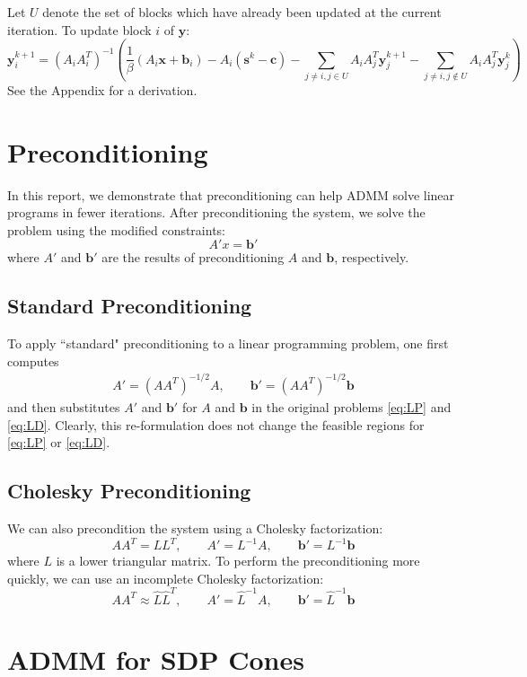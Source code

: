 \documentclass{article}
\begin{document}
Let $U$ denote the set of blocks which have already been updated at the current iteration. To update block $i$ of $\mathbf{y}$:
\[
\mathbf{y}_{i}^{k+1}=\left(A_{i}A_{i}^{T}\right)^{-1}\left(\frac{1}{\beta}\left(A_{i}\mathbf{x}+\mathbf{b}_{i}\right)-A_{i}\left(\mathbf{s}^{k}-\mathbf{c}\right)-\sum_{j\neq i,j\in U}A_{i}A_{j}^{T}\mathbf{y}_{j}^{k+1}-\sum_{j\neq i,j\notin U}A_{i}A_{j}^{T}\mathbf{y}_{j}^{k}\right)
\]
See the Appendix for a derivation.

\section{Preconditioning}
In this report, we demonstrate that preconditioning can help ADMM solve linear programs in fewer iterations. After preconditioning the system, we solve the problem using the modified constraints: 
\begin{equation}
A' x = \mathbf{b}'
\end{equation}
where $A'$ and $\mathbf{b}'$ are the results of preconditioning $A$ and $\mathbf{b}$, respectively.
\subsection*{Standard Preconditioning}
To apply ``standard" preconditioning to a linear programming problem, one first computes 
\begin{align}
A' = (AA^T )^{-1/2}A , \quad \quad \mathbf{b}' =(AA^T )^{-1/2}\mathbf{b}
\end{align}
and then substitutes $A'$ and $\mathbf{b}'$ for $A$ and $\mathbf{b}$ in the original problems \eqref{eq:LP} and \eqref{eq:LD}. Clearly, this re-formulation does not change the feasible regions for  \eqref{eq:LP} or \eqref{eq:LD}. 

\subsection*{Cholesky Preconditioning}
We  can also precondition the system using a Cholesky factorization:
\[
AA^{T}=LL^{T}, \quad \quad A'=L^{-1}A, \quad \quad \mathbf{b}'=L^{-1}\mathbf{b}
\]
where $L$ is a lower triangular matrix. To perform the preconditioning more quickly, we can use an incomplete Cholesky factorization:
\[
AA^{T} \approx \hat{L}\hat{L}^{T}, \quad \quad A'=\hat{L}^{-1}A, \quad \quad \mathbf{b}'=\hat{L}^{-1}\mathbf{b}
\]

\section{ADMM for SDP Cones}
\end{document}
